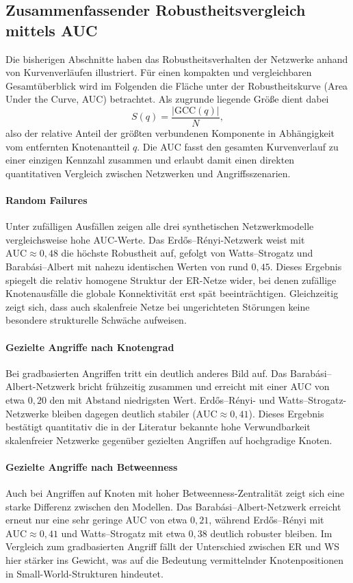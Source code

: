 \documentclass[12pt,a4paper]{article}
\begin{document}
\subsection{Zusammenfassender Robustheitsvergleich mittels AUC}

Die bisherigen Abschnitte haben das Robustheitsverhalten der Netzwerke anhand
von Kurvenverläufen illustriert. Für einen kompakten und vergleichbaren
Gesamtüberblick wird im Folgenden die Fläche unter der Robustheitskurve (Area
Under the Curve, AUC) betrachtet. Als zugrunde liegende Größe dient dabei
\[
S(q) = \frac{|\mathrm{GCC}(q)|}{N},
\]
also der relative Anteil der größten verbundenen Komponente in Abhängigkeit vom
entfernten Knotenantteil $q$. Die AUC fasst den gesamten Kurvenverlauf zu einer
einzigen Kennzahl zusammen und erlaubt damit einen direkten quantitativen
Vergleich zwischen Netzwerken und Angriffsszenarien.



\paragraph{Random Failures}
Unter zufälligen Ausfällen zeigen alle drei synthetischen Netzwerkmodelle
vergleichsweise hohe AUC-Werte. Das Erdős--Rényi-Netzwerk weist mit
$\mathrm{AUC}\approx0{,}48$ die höchste Robustheit auf, gefolgt von
Watts--Strogatz und Barabási--Albert mit nahezu identischen Werten von rund
$0{,}45$. Dieses Ergebnis spiegelt die relativ homogene Struktur der ER-Netze
wider, bei denen zufällige Knotenausfälle die globale Konnektivität erst spät
beeinträchtigen. Gleichzeitig zeigt sich, dass auch skalenfreie Netze bei
ungerichteten Störungen keine besondere strukturelle Schwäche aufweisen.

\paragraph{Gezielte Angriffe nach Knotengrad}
Bei gradbasierten Angriffen tritt ein deutlich anderes Bild auf. Das
Barabási--Albert-Netzwerk bricht frühzeitig zusammen und erreicht mit einer AUC
von etwa $0{,}20$ den mit Abstand niedrigsten Wert. Erdős--Rényi- und
Watts--Strogatz-Netzwerke bleiben dagegen deutlich stabiler
($\mathrm{AUC}\approx0{,}41$). Dieses Ergebnis bestätigt quantitativ die in der
Literatur bekannte hohe Verwundbarkeit skalenfreier Netzwerke gegenüber
gezielten Angriffen auf hochgradige Knoten.

\paragraph{Gezielte Angriffe nach Betweenness}
Auch bei Angriffen auf Knoten mit hoher Betweenness-Zentralität zeigt sich eine
starke Differenz zwischen den Modellen. Das Barabási--Albert-Netzwerk erreicht
erneut nur eine sehr geringe AUC von etwa $0{,}21$, während Erdős--Rényi mit
$\mathrm{AUC}\approx0{,}41$ und Watts--Strogatz mit etwa $0{,}38$ deutlich robuster
bleiben. Im Vergleich zum gradbasierten Angriff fällt der Unterschied zwischen
ER und WS hier stärker ins Gewicht, was auf die Bedeutung vermittelnder
Knotenpositionen in Small-World-Strukturen hindeutet.
\end{document}
